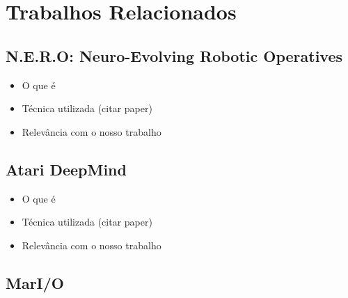 \chapter{\label{chap:related-work}Trabalhos Relacionados}



\section{N.E.R.O: Neuro-Evolving Robotic Operatives}

\begin{mdframed}[backgroundcolor=green!20]
\begin{itemize}
    \item
        O que é
    \item
        Técnica utilizada (citar paper)
    \item
        Relevância com o nosso trabalho
\end{itemize}
\end{mdframed}

\section{Atari DeepMind}

\begin{mdframed}[backgroundcolor=green!20]
\begin{itemize}
    \item
        O que é
    \item
        Técnica utilizada (citar paper)
    \item
        Relevância com o nosso trabalho
\end{itemize}
\end{mdframed}

\section{MarI/O}

